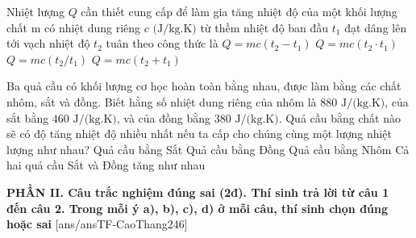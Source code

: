 \begin{ex}	Nhiệt lượng $Q$ cần thiết cung cấp để làm gia tăng nhiệt độ của một khối lượng chất m có nhiệt dung riêng $c\text{ (J/kg.K)}$ từ thềm nhiệt độ ban đầu $t_1$ đạt dâng lên tới vạch nhiệt độ $t_2$ tuân theo công thức là
	\choice
	{\True $Q=mc(t_2-t_1)$}
	{$Q=mc(t_2 \cdot t_1)$}
	{$Q=mc(t_2/t_1)$}
	{$Q=mc(t_2+t_1)$}
\end{ex}

\begin{ex}	Ba quả cầu có khối lượng cơ học hoàn toàn bằng nhau, được làm bằng các chất nhôm, sắt và đồng. Biết hằng số nhiệt dung riêng của nhôm là $880\text{ J/(kg.K)}$, của sắt bằng $460\text{ J/(kg.K)}$, và của đồng bằng $380\text{ J/(kg.K)}$. Quả cầu bằng chất nào sẽ có độ tăng nhiệt độ nhiều nhất nếu ta cấp cho chúng cùng một lượng nhiệt lượng như nhau?
	\choice
	{Quả cầu bằng Sắt}
	{\True Quả cầu bằng Đồng}
	{Quả cầu bằng Nhôm}
	{Cả hai quả cầu Sắt và Đồng tăng như nhau}
\end{ex}


\noindent \textbf{PHẦN II. Câu trắc nghiệm đúng sai (2đ). Thí sinh trả lời từ câu 1 đến câu 2. Trong mỗi ý a), b), c), d) ở mỗi câu, thí sinh chọn đúng hoặc sai}
[ans/ansTF-CaoThang246]


